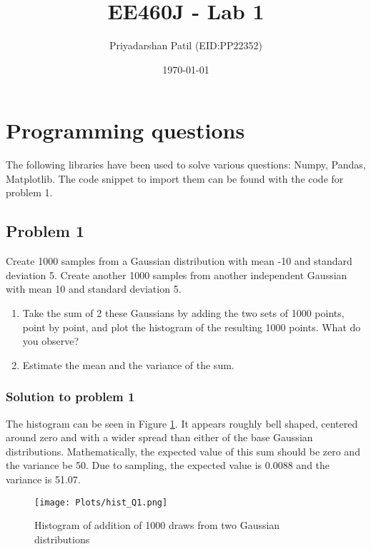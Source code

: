 \documentclass[12pt]{article}%
\begin{document}
\title{EE460J - Lab 1}
\author{Priyadarshan Patil (EID:PP22352)}
\date{\today}
\maketitle

\section{Programming questions}

The following libraries have been used to solve various questions: Numpy, Pandas, Matplotlib. The code snippet to import them can be found with the code for problem 1. 

\subsection{Problem 1}

Create 1000 samples from a Gaussian distribution with mean -10 and standard deviation 5. Create another 1000 samples from another independent Gaussian with mean 10 and standard deviation 5. 
\begin{enumerate}
    \item Take the sum of 2 these Gaussians by adding the two sets of 1000 points, point by point, and plot the histogram of the resulting 1000 points. What do you observe?
    \item Estimate the mean and the variance of the sum.
\end{enumerate}


\subsubsection{Solution to problem 1}

The histogram can be seen in Figure \ref{fig:hist_Q1}. It appears roughly bell shaped, centered around zero and with a wider spread than either of the base Gaussian distributions. Mathematically, the expected value of this sum should be zero and the variance be 50. Due to sampling, the expected value is 0.0088 and the variance is 51.07.\\

\begin{figure}[h]
\texttt{[image: Plots/hist\_Q1.png]}
\centering
\caption{Histogram of addition of 1000 draws from two Gaussian distributions}
\label{fig:hist_Q1}
\centering
\end{figure}
\end{document}
